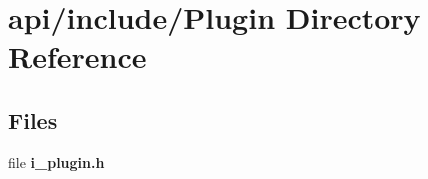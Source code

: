 \section{api/include/\+Plugin Directory Reference}
\label{dir_56e68009e30bd00c3cf2276804a6a16b}
\subsection*{Files}
\begin{DoxyCompactItemize}
\item 
file {\bfseries i\+\_\+plugin.\+h}
\end{DoxyCompactItemize}
